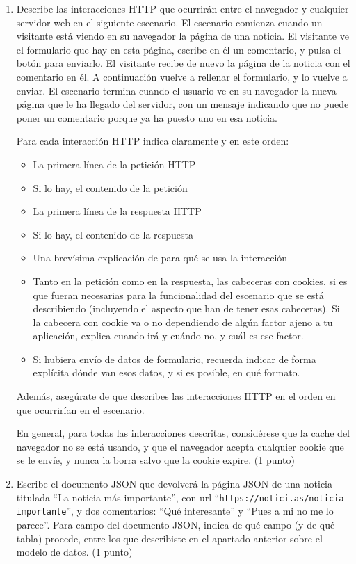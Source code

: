 \begin{enumerate}
\item Describe las interacciones HTTP que ocurrirán entre el navegador y cualquier servidor web en el siguiente escenario. El escenario comienza cuando un visitante está viendo en su navegador la página de una noticia. El visitante ve el formulario que hay en esta página, escribe en él un comentario, y pulsa el botón para enviarlo. El visitante recibe de nuevo la página de la noticia con el comentario en él. A continuación vuelve a rellenar el formulario, y lo vuelve a enviar. El escenario termina cuando el usuario ve en su navegador la nueva página que le ha llegado del servidor, con un mensaje indicando que no puede poner un comentario porque ya ha puesto uno en esa noticia.

  Para cada interacción HTTP indica claramente y en este orden:
  \begin{itemize}
  \item La primera línea de la petición HTTP
  \item Si lo hay, el contenido de la petición
  \item La primera línea de la respuesta HTTP
  \item Si lo hay, el contenido de la respuesta
  \item Una brevísima explicación de para qué se usa la interacción
  \item Tanto en la petición como en la respuesta, las cabeceras con cookies, si es que fueran necesarias para la funcionalidad del escenario que se está describiendo (incluyendo el aspecto que han de tener esas cabeceras). Si la cabecera con cookie va o no dependiendo de algún factor ajeno a tu aplicación, explica cuando irá y cuándo no, y cuál es ese factor.
  \item Si hubiera envío de datos de formulario, recuerda indicar de forma explícita dónde van esos datos, y si es posible, en qué formato.
  \end{itemize}

  Además, asegúrate de que describes las interacciones HTTP en el orden en que ocurrirían en el escenario.

  En general, para todas las interacciones descritas, considérese que la cache del navegador no se está usando, y que el navegador acepta cualquier cookie que se le envíe, y nunca la borra salvo que la cookie expire. (1 punto)

\item Escribe el documento JSON que devolverá la página JSON de una noticia titulada ``La noticia más importante'', con url ``\texttt{https://notici.as/noticia-importante}'', y dos comentarios: ``Qué interesante'' y ``Pues a mi no me lo parece''. Para campo del documento JSON, indica de qué campo (y de qué tabla) procede, entre los que describiste en el apartado anterior sobre el modelo de datos. (1 punto)
\end{enumerate}

